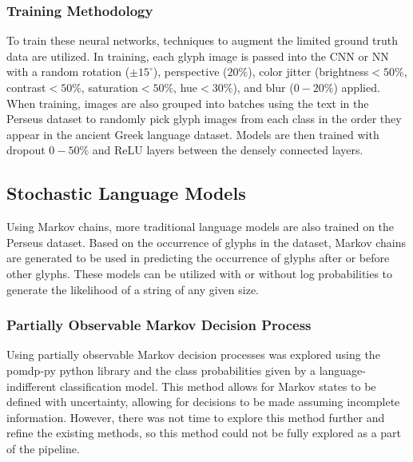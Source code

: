 \subsubsection{Training Methodology}

To train these neural networks, techniques to augment the limited ground truth data are utilized. In training, each glyph image is passed into the CNN or NN with a random rotation ($\pm 15^\circ$), perspective ($20\%$), color jitter (brightness$<50\%$, contrast$<50\%$, saturation$<50\%$, hue$<30\%$), and blur ($0-20\%$) applied. When training, images are also grouped into batches using the text in the Perseus dataset to randomly pick glyph images from each class in the order they appear in the ancient Greek language dataset. Models are then trained with dropout $0-50\%$ and ReLU layers between the densely connected layers.

\subsection{Stochastic Language Models}

Using Markov chains, more traditional language models are also trained on the Perseus dataset. Based on the occurrence of glyphs in the dataset, Markov chains are generated to be used in predicting the occurrence of glyphs after or before other glyphs. These models can be utilized with or without log probabilities to generate the likelihood of a string of any given size.

\subsubsection{Partially Observable Markov Decision Process}

Using partially observable Markov decision processes \cite{Astrom} was explored using the pomdp-py python library \cite{Zheng} and the class probabilities given by a language-indifferent classification model. This method allows for Markov states to be defined with uncertainty, allowing for decisions to be made assuming incomplete information. However, there was not time to explore this method further and refine the existing methods, so this method could not be fully explored as a part of the pipeline.
